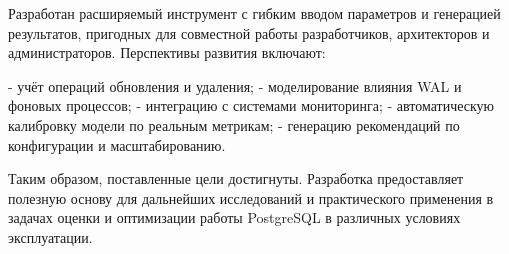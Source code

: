 Разработан расширяемый инструмент с гибким вводом параметров и генерацией результатов, пригодных для совместной работы разработчиков, архитекторов и администраторов. Перспективы развития включают:

- учёт операций обновления и удаления;
- моделирование влияния WAL и фоновых процессов;
- интеграцию с системами мониторинга;
- автоматическую калибровку модели по реальным метрикам;
- генерацию рекомендаций по конфигурации и масштабированию.

Таким образом, поставленные цели достигнуты. Разработка предоставляет полезную основу для дальнейших исследований и практического применения в задачах оценки и оптимизации работы PostgreSQL в различных условиях эксплуатации.
